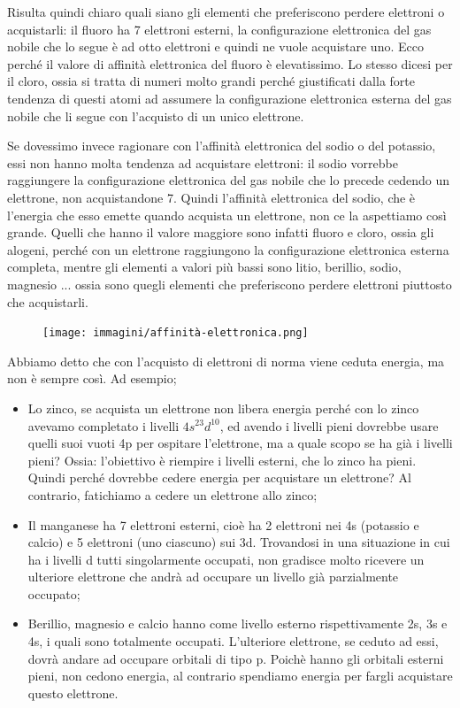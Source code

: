 Risulta quindi chiaro quali siano gli elementi che preferiscono perdere elettroni o acquistarli: il fluoro ha 7 elettroni esterni, la configurazione elettronica del gas nobile che lo segue è ad otto elettroni e quindi ne vuole acquistare uno. Ecco perché il valore di affinità elettronica del fluoro è elevatissimo. Lo stesso dicesi per il cloro, ossia si tratta di numeri molto grandi perché giustificati dalla forte tendenza di questi atomi ad assumere la configurazione elettronica esterna del gas nobile che li segue con l'acquisto di un unico elettrone.

\vspace{0.2cm}Se dovessimo invece ragionare con l'affinità elettronica del sodio o del potassio, essi non hanno molta tendenza ad acquistare elettroni: il sodio vorrebbe raggiungere la configurazione elettronica del gas nobile che lo precede cedendo un elettrone, non acquistandone 7. Quindi l'affinità elettronica del sodio, che è l'energia che esso emette quando acquista un elettrone, non ce la aspettiamo così grande. Quelli che hanno il valore maggiore sono infatti fluoro e cloro, ossia gli alogeni, perché con un elettrone raggiungono la configurazione elettronica esterna completa, mentre gli elementi a valori più bassi sono litio, berillio, sodio, magnesio ... ossia sono quegli elementi che preferiscono perdere elettroni piuttosto che acquistarli.

\begin{figure}[H]
    \centering
    \texttt{[image: immagini/affinità-elettronica.png]}
\end{figure}

Abbiamo detto che con l'acquisto di elettroni di norma viene ceduta energia, ma non è sempre così. Ad esempio; 
\begin{itemize}
    \item Lo zinco, se acquista un elettrone non libera energia perché con lo zinco avevamo completato i livelli $4s^23d^{10}$, ed avendo i livelli pieni dovrebbe usare quelli suoi vuoti 4p per ospitare l'elettrone, ma a quale scopo se ha già i livelli pieni? Ossia: l'obiettivo è riempire i livelli esterni, che lo zinco ha pieni. Quindi perché dovrebbe cedere energia per acquistare un elettrone? Al contrario, fatichiamo a cedere un elettrone allo zinco;
    \item Il manganese ha 7 elettroni esterni, cioè ha 2 elettroni nei 4s (potassio e calcio) e 5 elettroni (uno ciascuno) sui 3d. Trovandosi in una situazione in cui ha i livelli d tutti singolarmente occupati, non gradisce molto ricevere un ulteriore elettrone che andrà ad occupare un livello già parzialmente occupato;
    \item Berillio, magnesio e calcio hanno come livello esterno rispettivamente 2s, 3s e 4s, i quali sono totalmente occupati. L'ulteriore elettrone, se ceduto ad essi, dovrà andare ad occupare orbitali di tipo p. Poichè hanno gli orbitali esterni pieni, non cedono energia, al contrario spendiamo energia per fargli acquistare questo elettrone.
\end{itemize}


